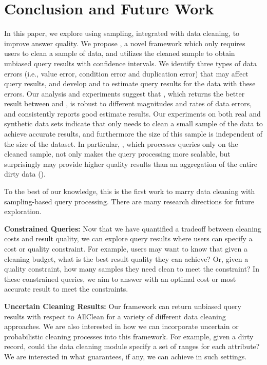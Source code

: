 \vspace{-.5em}
\section{Conclusion and Future Work}\label{sec:con}
In this paper, we explore using sampling, integrated with data cleaning, to improve answer quality. We propose \saqpplus, a novel framework which only requires users to clean a sample of data, and utilizes the cleaned sample to obtain unbiased query results with confidence intervals.
We identify three types of data errors (i.e., value error, condition error and duplication error) that may affect query results, and develop \biascorrected and \sampleclean to estimate query results for the data with these errors.
Our analysis and experiments suggest that \saqpplus, which returns the better result between \biascorrected and \sampleclean, is robust to different magnitudes and rates of data errors, and consistently reports good estimate results.
Our experiments on both real and synthetic data sets indicate that \saqpplus only needs to clean a small sample of the data to achieve accurate results, and furthermore the size of this sample is independent of the size of the dataset.
In particular, \sampleclean, which processes queries only on the cleaned sample, not only makes the query processing more scalable, but surprisingly may provide higher quality results than an aggregation of the entire dirty data (\alldirty).

To the best of our knowledge, this is the first work to marry data cleaning with sampling-based query processing.
There are many research directions for future exploration. 

\vspace{.25em}
{\noindent \bf Constrained Queries:} Now that we have quantified a tradeoff between cleaning costs and result quality, we can explore query results where users can specify a cost or quality constraint. For example, users may want to know that given a cleaning budget, what is the best result quality they can achieve? Or, given a quality constraint, how many samples they need clean to meet the constraint? 
In these constrained queries, we aim to answer with an optimal cost or most accurate result to meet the constraints.

\vspace{.25em}
{\noindent \bf Uncertain Cleaning Results:}  Our framework can return unbiased query results with respect to AllClean for a variety of different data cleaning approaches.
We are also interested in how we can incorporate uncertain or probabilistic cleaning processes into this framework.
For example, given a dirty record, could the data cleaning module specify a set of ranges for each attribute? 
We are interested in what guarantees, if any, we can achieve in such settings.

